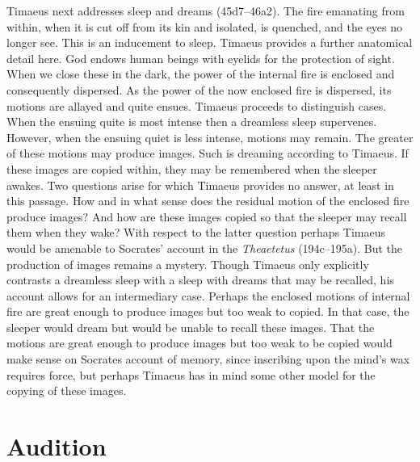 Timaeus next addresses sleep and dreams (45d7--46a2). The fire emanating from within, when it is cut off from its kin and isolated, is quenched, and the eyes no longer see. This is an inducement to sleep. Timaeus provides a further anatomical detail here. God endows human beings with eyelids for the protection of sight. When we close these in the dark, the power of the internal fire is enclosed and consequently dispersed. As the power of the now enclosed fire is dispersed, its motions are allayed and quite ensues. Timaeus proceeds to distinguish cases. When the ensuing quite is most intense then a dreamless sleep supervenes. However, when the ensuing quiet is less intense, motions may remain. The greater of these motions may produce images. Such is dreaming according to Timaeus. If these images are copied within, they may be remembered when the sleeper awakes. Two questions arise for which Timaeus provides no answer, at least in this passage. How and in what sense does the residual motion of the enclosed fire produce images? And how are these images copied so that the sleeper may recall them when they wake? With respect to the latter question perhaps Timaeus would be amenable to Socrates' account in the \emph{Theaetetus} (194c--195a). But the production of images remains a mystery. Though Timaeus only explicitly contrasts a dreamless sleep with a sleep with dreams that may be recalled, his account allows for an intermediary case. Perhaps the enclosed motions of internal fire are great enough to produce images but too weak to copied. In that case, the sleeper would dream but would be unable to recall these images. That the motions are great enough to produce images but too weak to be copied would make sense on Socrates account of memory, since inscribing upon the mind's wax requires force, but perhaps Timaeus has in mind some other model for the copying of these images. 


\section{Audition} %
\label{sec:audition}




